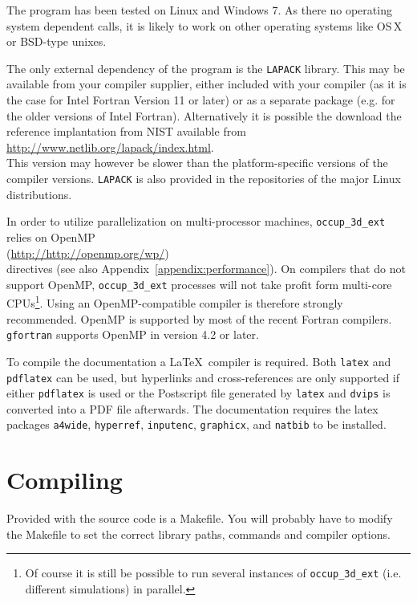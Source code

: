 \documentclass[a4paper,10pt]{article}
\begin{document}
The program has been tested on Linux and Windows 7. As there no operating system 
dependent calls, it is likely to work on other operating systems like OS\,X or 
BSD-type unixes. 

The only external dependency of the program is the \texttt{LAPACK} library. This 
may be available from your compiler supplier, either included with your compiler 
(as it is the case for Intel Fortran Version 11 or later) or as a separate  
package (e.g. for the older versions of Intel Fortran). Alternatively it is 
possible the download the reference implantation from NIST available from\\ 
\url{http://www.netlib.org/lapack/index.html}.\\ This version may however be 
slower than the platform-specific versions of the compiler versions. 
\texttt{LAPACK} is also provided in the repositories of the major Linux 
distributions.

In order to utilize parallelization on multi-processor machines, 
\texttt{occup\_3d\_ext} relies on OpenMP\\ 
(\url{http://http://openmp.org/wp/})\\ directives (see also 
Appendix~\ref{appendix:performance}). On compilers that do not 
support OpenMP, \texttt{occup\_3d\_ext} processes will not take profit form 
multi-core CPUs\footnote{Of course it is still be possible to run several 
instances  of \texttt{occup\_3d\_ext} (i.e. different simulations) in 
parallel.}. Using an OpenMP-compatible compiler is therefore strongly 
recommended. OpenMP is supported by most of the recent Fortran compilers. 
\texttt{gfortran} supports OpenMP in version 4.2 or later. 

To compile the documentation a \LaTeX\ compiler is required. Both \texttt{latex} 
and \texttt{pdflatex} can be used, but hyperlinks and cross-references are only 
supported if either \texttt{pdflatex} is used or the Postscript file 
generated by \texttt{latex} and \texttt{dvips} is converted 
into a PDF file afterwards. The documentation requires the latex packages 
\texttt{a4wide}, \texttt{hyperref}, \texttt{inputenc}, \texttt{graphicx}, and 
\texttt{natbib} to be installed.

\section{Compiling}
Provided with the source code is a Makefile.
You will probably have to modify the Makefile to
set the correct library paths, commands and compiler options.
\end{document}
